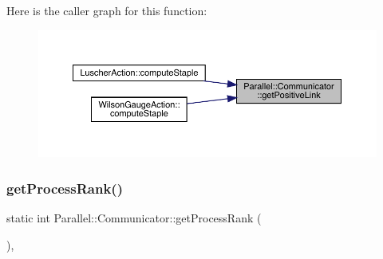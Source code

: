 Here is the caller graph for this function\+:\nopagebreak
\begin{figure}[H]
\begin{center}
\leavevmode
\includegraphics[width=350pt]{class_parallel_1_1_communicator_aa716fcde544018dcc5967df9b6708bb5_icgraph}
\end{center}
\end{figure}
\mbox{\label{class_parallel_1_1_communicator_a474ab433da0e83ef372d74e26a7e5cb0}} 
\subsubsection{\texorpdfstring{getProcessRank()}{getProcessRank()}}
{\footnotesize\ttfamily static int Parallel\+::\+Communicator\+::get\+Process\+Rank (\begin{DoxyParamCaption}{ }\end{DoxyParamCaption})\hspace{0.3cm}{\ttfamily [inline]}, {\ttfamily [static]}}

